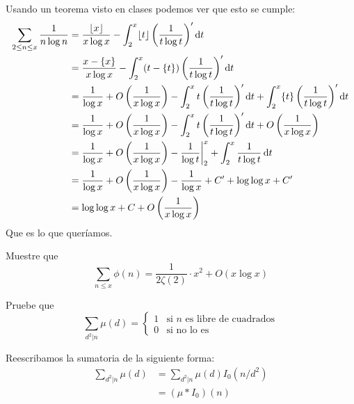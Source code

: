 \begin{sol}
    Usando un teorema visto en clases podemos ver que esto se cumple:
    \begin{align*}
        \sum_{2\leq n\leq x}\frac{1}{n\log n}&=\frac{\lfloor x\rfloor}{x\log x}-\int_2^x\lfloor t\rfloor \left(\frac{1}{t\log t}\right)'\operatorname{d}\!{t}\\
        &=\frac{x-\{x\}}{x\log x}-\int_2^x (t-\{t\}) \left(\frac{1}{t\log t}\right)'\operatorname{d}\!{t}\\
        &=\frac{1}{\log x}+O\left(\frac{1}{x\log x}\right)-\int_2^x t \left(\frac{1}{t\log t}\right)'\operatorname{d}\!{t}+\int_2^x \{t\}\left(\frac{1}{t\log t}\right)'\operatorname{d}\!{t}\\
        &=\frac{1}{\log x}+O\left(\frac{1}{x\log x}\right)-\int_2^x t \left(\frac{1}{t\log t}\right)'\operatorname{d}\!{t}+O\left(\frac{1}{x\log x}\right)\\
        &=\frac{1}{\log x}+O\left(\frac{1}{x\log x}\right)-\frac{1}{\log t}\bigg\rvert_2^x+\int_2^x \frac{1}{t\log t}\operatorname{d}\!{t}\\
        &=\frac{1}{\log x}+O\left(\frac{1}{x\log x}\right)-\frac{1}{\log x}+C'+\log\log x+C'\\
        &=\log\log x+C+O\left(\frac{1}{x\log x}\right)
    \end{align*}
    Que es lo que queríamos.
\end{sol}

\begin{prob}
	Muestre que
	\[\sum_{n\leq x}\phi(n)=\frac{1}{2\zeta(2)}\cdot x^2+O(x\log x)\]
\end{prob}

\begin{sol}

\end{sol}

\begin{prob}
	Pruebe que
	\[\sum_{d^2|n}\mu(d)=\begin{cases}
			1 & \text{si $n$ es libre de cuadrados} \\
			0 & \text{si no lo es}
		\end{cases}\]
\end{prob}

\begin{sol}
    Reescribamos la sumatoria de la siguiente forma:
    \begin{align*}
        \sum_{d^2|n}\mu(d)&=\sum_{d^2|n}\mu(d)I_0(n/d^2)\\
        &=(\mu*I_0)(n)
    \end{align*}
\end{sol}

